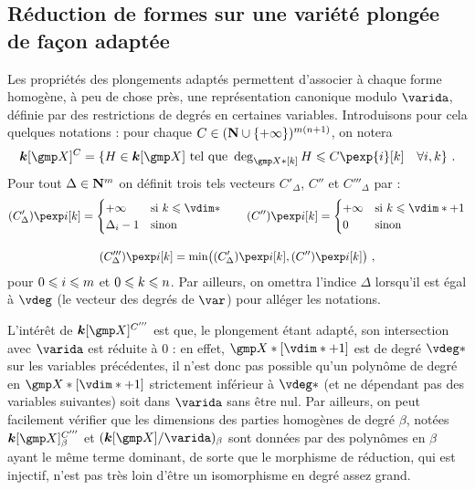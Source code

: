 
\subsection{Réduction de formes sur une variété plongée de façon adaptée}
\label{sec:rfull}

Les propriétés des plongements adaptés permettent d'associer à chaque forme
homogène, à peu de chose près, une représentation canonique modulo \( \varida
\), définie par des restrictions de degrés en certaines variables.
Introduisons pour cela quelques notations : pour chaque \( C \in ({\mathbf{N}} \cup
  \lbrace +\infty \rbrace) ^{m(n+1)} \), on notera
\begin{equation} \label{e:C-spaces}
  \cdn[\vmp]^C
  = \{
    H \in \cdn[\vmp]
    \text{ tel que }
    \deg_{\vmp*[k]} H \le C\pexp{\fct}[k]
    \quad \forall i, k
    \}
  \pmm.
\end{equation}
Pour tout \( \Delta \in {\mathbf{N}}^m \) on définit trois tels vecteurs \(
  C'_\Delta \), \( C'' \) et \( C'''_\Delta \) par :
\begin{gather} \label{e:C-i-iii}
  (C'_\Delta)\pexp\fct[\ind] =
  \begin{cases}
    +\infty & \text{si \( \ind \le \vdim* \)} \\
    \Delta_\fct - 1 & \text{sinon}
  \end{cases}
  \qquad
  (C'')\pexp\fct[\ind] =
  \begin{cases}
    +\infty & \text{si \( \ind \le \vdim* + 1 \)} \\
    0 & \text{sinon}
  \end{cases}
  \\[1em]
  (C'''_\Delta)\pexp\fct[\ind] = \min\bigl(
    (C'_\Delta)\pexp\fct[\ind], (C'')\pexp\fct[\ind]
  \bigr)
  \pmm,
\end{gather}
pour \( 0 \leqslant i \leqslant m \) et \( 0 \leqslant k \leqslant n \).  Par ailleurs, on
omettra l'indice \( \Delta \) lorsqu'il est égal à \( \vdeg \) (le vecteur des
degrés de \( \var \)) pour alléger les notations.

L'intérêt de \( \cdn[ \vmp ]^{C'''} \) est que, le plongement étant
adapté, son intersection avec \( \varida \) est réduite à \( 0 \) : en effet,
\( \vmp*[\vdim*+1] \) est de degré \( \vdeg* \) sur les variables précédentes,
il n'est donc pas possible qu'un polynôme de degré en \( \vmp*[\vdim*+1] \)
strictement inférieur à \( \vdeg* \) (et ne dépendant pas des variables
suivantes) soit dans \( \varida \) sans être nul.
Par ailleurs, on peut facilement vérifier que les dimensions des parties
homogènes de degré \( \beta \), notées \( \cdn[ \vmp ]^{C'''}_{\beta} \) et \(
  ( \cdn[\vmp] / \varida)_\beta \) sont données par des polynômes en \( \beta
\) ayant le même terme dominant, de sorte que le morphisme de réduction, qui
est injectif, n'est pas très loin d'être un isomorphisme en degré assez grand.

